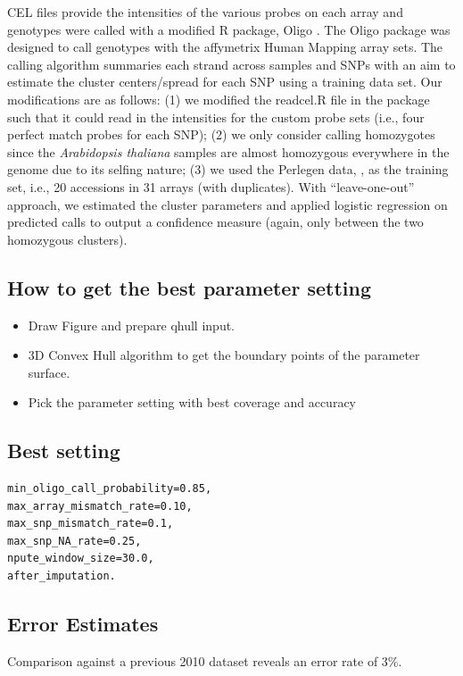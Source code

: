 \documentclass[a4paper,10pt]{article}
\begin{document}
CEL files provide the intensities of the various probes on each array and genotypes were called with a modified R package, Oligo \cite{Carvalho2007}.  The Oligo package was designed to call genotypes with the affymetrix Human Mapping array sets.  The calling algorithm summaries each strand across samples and SNPs with an aim to estimate the cluster centers/spread for each SNP using a training data set.  Our modifications are as follows: (1) we modified the readcel.R file in the package such that it could read in the intensities for the custom probe sets (i.e., four perfect match probes for each SNP); (2) we only consider calling homozygotes since the \textit{Arabidopsis thaliana} samples are almost homozygous everywhere in the genome due to its selfing nature; (3) we used the Perlegen data, \cite{Clark2007a}, as the training set, i.e., 20 accessions in 31 arrays (with duplicates). With “leave-one-out” approach, we estimated the cluster parameters and applied logistic regression on predicted calls to output a confidence measure (again, only between the two homozygous clusters).

\subsection{How to get the best parameter setting}
\begin{itemize}
 \item Draw Figure and prepare qhull input.
 \item 3D Convex Hull algorithm to get the boundary points of the parameter surface.
 \item Pick the parameter setting with best coverage and accuracy
\end{itemize}

\subsection{Best setting}
\begin{verbatim}
min_oligo_call_probability=0.85,
max_array_mismatch_rate=0.10,
max_snp_mismatch_rate=0.1,
max_snp_NA_rate=0.25,
npute_window_size=30.0,
after_imputation.
\end{verbatim}


\subsection{Error Estimates}
Comparison against a previous 2010 dataset \cite{Nordborg2005} reveals an error rate of 3\%.
\end{document}
